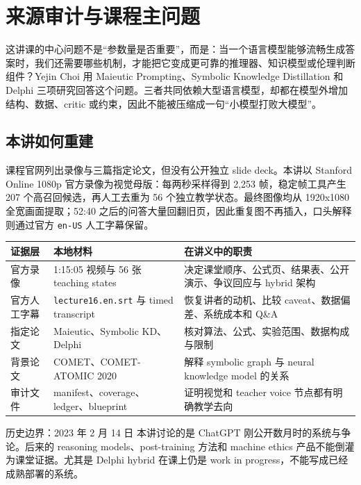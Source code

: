 \documentclass[a4paper]{article}
\begin{document}
\makecscover

\section{来源审计与课程主问题}

这讲课的中心问题不是“参数量是否重要”，而是：当一个语言模型能够流畅生成答案时，我们还需要哪些机制，才能把它变成更可靠的推理器、知识模型或伦理判断组件？Yejin Choi 用 Maieutic Prompting、Symbolic Knowledge Distillation 和 Delphi 三项研究回答这个问题。三者共同依赖大型语言模型，却都在模型外增加结构、数据、critic 或约束，因此不能被压缩成一句“小模型打败大模型”。

\subsection{本讲如何重建}

课程官网列出录像与三篇指定论文，但没有公开独立 slide deck。本讲以 Stanford Online 1080p 官方录像为视觉母版：每两秒采样得到 2,253 帧，稳定帧工具产生 207 个高召回候选，再人工去重为 56 个独立教学状态。最终图像均从 1920x1080 全宽画面提取；52:40 之后的问答大量回翻旧页，因此重复图不再插入，口头解释则通过官方 \texttt{en-US} 人工字幕保留。

\begin{longtable}{@{}L{0.18\textwidth}L{0.27\textwidth}L{0.43\textwidth}@{}}
\toprule
证据层 & 本地材料 & 在讲义中的职责 \\
\midrule
官方录像 & 1:15:05 视频与 56 张 teaching states & 决定课堂顺序、公式页、结果表、公开演示、争议回应与 hybrid 架构 \\
官方人工字幕 & \texttt{lecture16.en.srt} 与 timed transcript & 恢复讲者的动机、比较 caveat、数据偏差、系统成本和 Q\&A \\
指定论文 & Maieutic、Symbolic KD、Delphi & 核对算法、公式、实验范围、数据构成与限制 \\
背景论文 & COMET、COMET-ATOMIC 2020 & 解释 symbolic graph 与 neural knowledge model 的关系 \\
审计文件 & manifest、coverage、ledger、blueprint & 证明视觉和 teacher voice 节点都有明确教学去向 \\
\bottomrule
\end{longtable}

\begin{warningbox}{历史边界：2023 年 2 月 14 日}
本讲讨论的是 ChatGPT 刚公开数月时的系统与争论。后来的 reasoning models、post-training 方法和 machine ethics 产品不能倒灌为课堂证据。尤其是 Delphi hybrid 在课上仍是 work in progress，不能写成已经成熟部署的系统。
\end{warningbox}
\end{document}
